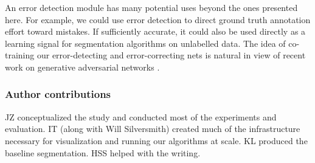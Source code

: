 \documentclass{article}
\begin{document}
An error detection module has many potential uses beyond the ones presented
here. For example, we could use error detection to direct ground truth
annotation effort toward mistakes. If sufficiently accurate, it could also be
used directly as a learning signal for segmentation algorithms on unlabelled
data. The idea of co-training our error-detecting and error-correcting nets is
natural in view of recent work on generative adversarial networks
\cite{cgan1,cgan2}.




\subsubsection*{Author contributions}
JZ conceptualized the study and conducted most of the experiments and
evaluation. IT (along with Will Silversmith) created much of the infrastructure
necessary for visualization and running our algorithms at scale. KL produced the
baseline segmentation. HSS helped with the writing.
\end{document}
